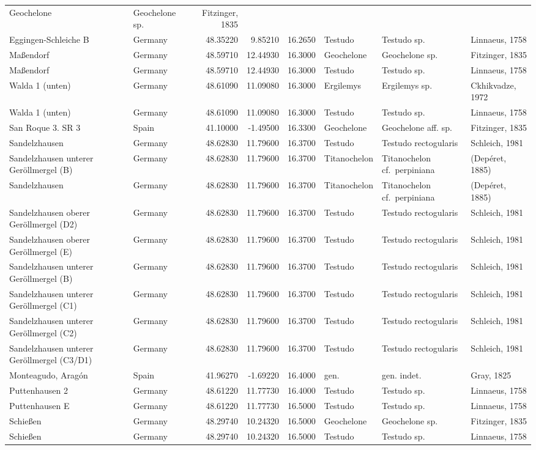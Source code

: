 \documentclass[]{article}
\begin{document}
\begin{longtable}[]{@{}llrrrlll@{}}
Geochelone & Geochelone sp. & Fitzinger, 1835\tabularnewline
Eggingen-Schleiche B & Germany & 48.35220 & 9.85210 & 16.2650 & Testudo
& Testudo sp. & Linnaeus, 1758\tabularnewline
Maßendorf & Germany & 48.59710 & 12.44930 & 16.3000 & Geochelone &
Geochelone sp. & Fitzinger, 1835\tabularnewline
Maßendorf & Germany & 48.59710 & 12.44930 & 16.3000 & Testudo & Testudo
sp. & Linnaeus, 1758\tabularnewline
Walda 1 (unten) & Germany & 48.61090 & 11.09080 & 16.3000 & Ergilemys &
Ergilemys sp. & Ckhikvadze, 1972\tabularnewline
Walda 1 (unten) & Germany & 48.61090 & 11.09080 & 16.3000 & Testudo &
Testudo sp. & Linnaeus, 1758\tabularnewline
San Roque 3. SR 3 & Spain & 41.10000 & -1.49500 & 16.3300 & Geochelone &
Geochelone aff. sp. & Fitzinger, 1835\tabularnewline
Sandelzhausen & Germany & 48.62830 & 11.79600 & 16.3700 & Testudo &
Testudo rectogularis & Schleich, 1981\tabularnewline
Sandelzhausen unterer Geröllmergel (B) & Germany & 48.62830 & 11.79600 &
16.3700 & Titanochelon & Titanochelon cf.~perpiniana & (Depéret,
1885)\tabularnewline
Sandelzhausen & Germany & 48.62830 & 11.79600 & 16.3700 & Titanochelon &
Titanochelon cf.~perpiniana & (Depéret, 1885)\tabularnewline
Sandelzhausen oberer Geröllmergel (D2) & Germany & 48.62830 & 11.79600 &
16.3700 & Testudo & Testudo rectogularis & Schleich, 1981\tabularnewline
Sandelzhausen oberer Geröllmergel (E) & Germany & 48.62830 & 11.79600 &
16.3700 & Testudo & Testudo rectogularis & Schleich, 1981\tabularnewline
Sandelzhausen unterer Geröllmergel (B) & Germany & 48.62830 & 11.79600 &
16.3700 & Testudo & Testudo rectogularis & Schleich, 1981\tabularnewline
Sandelzhausen unterer Geröllmergel (C1) & Germany & 48.62830 & 11.79600
& 16.3700 & Testudo & Testudo rectogularis & Schleich,
1981\tabularnewline
Sandelzhausen unterer Geröllmergel (C2) & Germany & 48.62830 & 11.79600
& 16.3700 & Testudo & Testudo rectogularis & Schleich,
1981\tabularnewline
Sandelzhausen unterer Geröllmergel (C3/D1) & Germany & 48.62830 &
11.79600 & 16.3700 & Testudo & Testudo rectogularis & Schleich,
1981\tabularnewline
Monteagudo, Aragón & Spain & 41.96270 & -1.69220 & 16.4000 & gen. & gen.
indet. & Gray, 1825\tabularnewline
Puttenhausen 2 & Germany & 48.61220 & 11.77730 & 16.4000 & Testudo &
Testudo sp. & Linnaeus, 1758\tabularnewline
Puttenhausen E & Germany & 48.61220 & 11.77730 & 16.5000 & Testudo &
Testudo sp. & Linnaeus, 1758\tabularnewline
Schießen & Germany & 48.29740 & 10.24320 & 16.5000 & Geochelone &
Geochelone sp. & Fitzinger, 1835\tabularnewline
Schießen & Germany & 48.29740 & 10.24320 & 16.5000 & Testudo & Testudo
sp. & Linnaeus, 1758\tabularnewline

\end{longtable}
\end{document}
